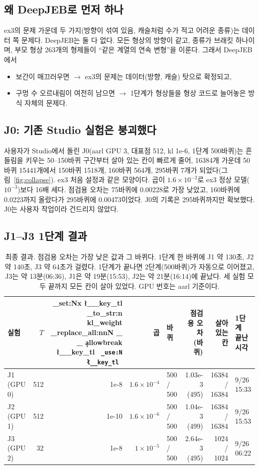 \documentclass[11pt]{article}
\DeclareRobustCommand{\key}[1]{
  \tl_set:Nx \l__key_tl { \tl_to_str:n {#1} }
  \regex_replace_all:nnN { \_ } { \cO\_ \c{allowbreak} } \l__key_tl
  \texttt{ \tl_use:N \l__key_tl }
}
\begin{document}
\subsection{왜 DeepJEB로 먼저 하나}

ex3의 문제 가운데 두 가지(방향이 섞여 있음, 캐슬처럼 수가 적고 어려운 종류)는 데이터 쪽 문제다. DeepJEB는 둘 다 없다.
모든 형상의 방향이 같고, 종류가 브래킷 하나이며, 부모 형상 263개의 형제들이 ``같은 계열의 연속 변형''을 이룬다.
그래서 DeepJEB에서
\begin{itemize}
\item 보간이 매끄러우면 $\rightarrow$ ex3의 문제는 데이터(방향, 캐슬) 탓으로 확정되고,
\item 구멍 수 오르내림이 여전히 남으면 $\rightarrow$ 1단계가 형상들을 형상 코드로 늘어놓은 방식 자체의 문제다.
\end{itemize}

\subsection{J0: 기존 Studio 실험은 붕괴했다}

사용자가 Studio에서 돌린 J0(aarl GPU 3, 대표점 512, kl 1e-6, 1단계 500바퀴)는 흔들림을 키우는 50--150바퀴 구간부터 살아 있는 칸이
빠르게 줄어, 16384개 가운데 50바퀴 15441개에서 150바퀴 1518개, 160바퀴 564개, 295바퀴 7개가 되었다(그림~\ref{fig:collapse}). ex3 처음 설정과 같은 모양이다. 곱이 $1.6\times10^{-2}$로 ex3 정상 모델($10^{-3}$)보다
16배 세다. 점검용 오차는 75바퀴에 0.00228로 가장 낮았고, 160바퀴에 0.0223까지 올랐다가 295바퀴에 0.00473이었다.
J0의 기록은 295바퀴까지만 확보했다. J0는 사용자 작업이라 건드리지 않았다.

\subsection{J1--J3 1단계 결과}

\begin{table}[htbp]
\centering\small\setlength{\tabcolsep}{4.5pt}
\begin{tabular}{l r r r l r r l}
\toprule
실험 & $T$ & \key{kl_weight} & 곱 & 바퀴 & \shortstack[r]{점검용 오차\\(바퀴)} & \shortstack[r]{살아 있는\\칸} & \shortstack[l]{1단계\\끝난 시각} \\
\midrule
J1 (GPU 0) & 512 & 1e-8 & $1.6\times10^{-4}$ & 500 / 500 & 1.03e-3 (495) & 16384 / 16384 & 9/26 15:33 \\
J2 (GPU 1) & 512 & 1e-10 & $1.6\times10^{-6}$ & 500 / 500 & 1.04e-3 (499) & 16384 / 16384 & 9/26 15:53 \\
J3 (GPU 2) & 32 & 1e-8 & $1\times10^{-5}$ & 500 / 500 & 2.64e-3 (495) & 1024 / 1024 & 9/26 06:22 \\
\bottomrule
\end{tabular}
\caption{최종 결과. 점검용 오차는 가장 낮은 값과 그 바퀴다. 1단계 한 바퀴에 J1 약 130초, J2 약 140초, J3 약 64초가 걸렸다.
1단계가 끝나면 2단계(500바퀴)가 자동으로 이어졌고, J3는 약 13분(06:36), J1은 약 19분(15:53), J2는 약 21분(16:14)에 끝났다.
세 실험 모두 끝까지 모든 칸이 살아 있었다.
GPU 번호는 aarl 기준이다.}
\label{tab:jstatus}
\end{table}
\end{document}
